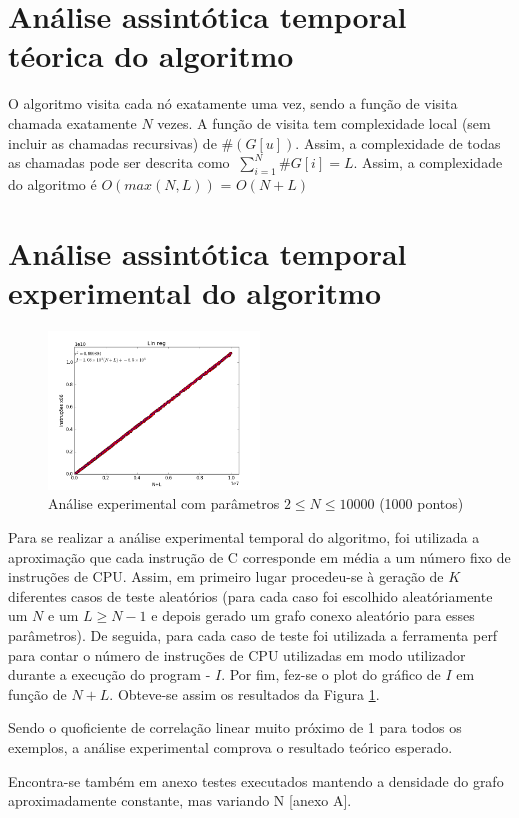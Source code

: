 \documentclass{scrartcl}
\begin{document}
\section*{Análise assintótica temporal téorica do algoritmo}
O algoritmo visita cada nó exatamente uma vez, sendo a função de visita chamada exatamente $N$ vezes. A função de visita tem complexidade local (sem incluir as chamadas recursivas) de $\#(G[u])$. Assim, a complexidade de todas as chamadas pode ser descrita como $\ \sum_{i=1}^{N} \#G[i] = L$.
Assim, a complexidade do algoritmo é $O(max(N,L))$ = $O(N+L)$

\section*{Análise assintótica temporal experimental do algoritmo}
\begin{figure} %
	\centering
	\includegraphics[width=0.5\textwidth]{../images/analiseExp_1e5.png}
	\caption{Análise experimental com parâmetros $2 \le N \le 10000 $ (1000 pontos)}
	\label{fig:analexp}
\end{figure}
Para se realizar a análise experimental temporal do algoritmo, foi utilizada a aproximação que cada instrução de C corresponde em média a um número fixo de instruções de CPU. Assim, em primeiro lugar procedeu-se à geração de $K$ diferentes casos de teste aleatórios (para cada caso foi escolhido aleatóriamente um $N$ e um $L\ge N-1$ e depois gerado um grafo conexo aleatório para esses parâmetros). De seguida, para cada caso de teste foi utilizada a ferramenta perf para contar o número de instruções de CPU utilizadas em modo utilizador durante a execução do program - $I$. Por fim, fez-se o plot do gráfico de $I$ em função de $N+L$. Obteve-se assim os resultados da Figura \ref{fig:analexp}.\par
Sendo o quoficiente de correlação linear muito próximo de 1 para todos os exemplos, a análise experimental comprova o resultado teórico esperado. \par
Encontra-se também em anexo testes executados mantendo a densidade do grafo aproximadamente constante, mas variando N [anexo A].
\end{document}
